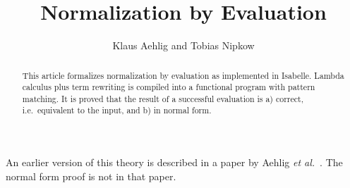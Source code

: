 \documentclass[11pt,a4paper]{article}
\begin{document}
\title{Normalization by Evaluation}
\author{Klaus Aehlig and Tobias Nipkow}
\maketitle

\begin{abstract}
This article formalizes normalization by evaluation as implemented in
Isabelle. Lambda calculus plus term rewriting is compiled into a functional
program with pattern matching. It is proved that the result of a successful
evaluation is a) correct, i.e.\ equivalent to the input, and b) in normal
form.
\end{abstract}

An earlier version of this theory is described in a paper by Aehlig \emph{et
al.}~\cite{AehligHN-TPHOLs08}. The normal form proof is not in that paper.





\end{document}
